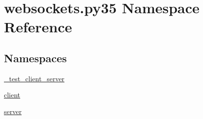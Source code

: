 \hypertarget{namespacewebsockets_1_1py35}{}\section{websockets.\+py35 Namespace Reference}
\label{namespacewebsockets_1_1py35}
\subsection*{Namespaces}
\begin{DoxyCompactItemize}
\item 
 \hyperlink{namespacewebsockets_1_1py35_1_1__test__client__server}{\+\_\+test\+\_\+client\+\_\+server}
\item 
 \hyperlink{namespacewebsockets_1_1py35_1_1client}{client}
\item 
 \hyperlink{namespacewebsockets_1_1py35_1_1server}{server}
\end{DoxyCompactItemize}
